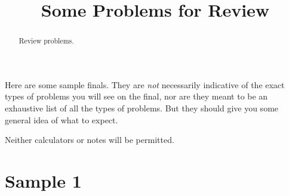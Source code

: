 \documentclass{ximera}
\title{Some Problems for Review}
\begin{document}
\begin{abstract}
Review problems.
\end{abstract}
\maketitle

Here are some sample finals. They are \emph{not} necessarily indicative of the exact types of problems you will see on the final, nor are they meant to be an exhaustive list of all the types of problems. But they should give you some general idea of what to expect.

Neither calculators or notes will be permitted. 

\section{Sample 1}
\end{document}
